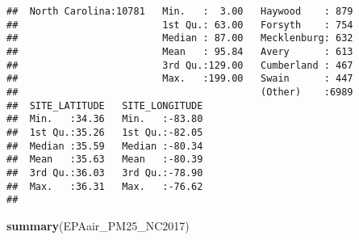 \documentclass[]{article}
\newenvironment{Shaded}{\begin{snugshade}}{\end{snugshade}}
\newcommand{\KeywordTok}[1]{\textcolor[rgb]{0.13,0.29,0.53}{\textbf{#1}}}
\newcommand{\NormalTok}[1]{#1}
\begin{document}
\begin{verbatim}
##  North Carolina:10781   Min.   :  3.00   Haywood    : 879  
##                         1st Qu.: 63.00   Forsyth    : 754  
##                         Median : 87.00   Mecklenburg: 632  
##                         Mean   : 95.84   Avery      : 613  
##                         3rd Qu.:129.00   Cumberland : 467  
##                         Max.   :199.00   Swain      : 447  
##                                          (Other)    :6989  
##  SITE_LATITUDE   SITE_LONGITUDE  
##  Min.   :34.36   Min.   :-83.80  
##  1st Qu.:35.26   1st Qu.:-82.05  
##  Median :35.59   Median :-80.34  
##  Mean   :35.63   Mean   :-80.39  
##  3rd Qu.:36.03   3rd Qu.:-78.90  
##  Max.   :36.31   Max.   :-76.62  
## 
\end{verbatim}

\begin{Shaded}
\begin{Highlighting}[]
\KeywordTok{summary}\NormalTok{(EPAair_PM25_NC2017)}
\end{Highlighting}
\end{Shaded}
\end{document}
